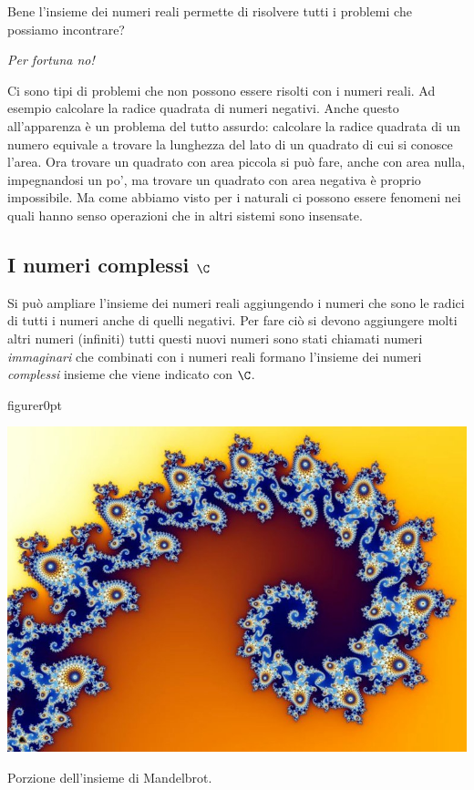 Bene l'insieme dei numeri reali permette di risolvere tutti i problemi che 
possiamo incontrare? 

\begin{center} \emph{Per fortuna no!} \end{center} 

Ci sono tipi di problemi che non possono essere risolti con i numeri reali.
Ad esempio calcolare la radice quadrata di numeri negativi. Anche questo 
all'apparenza è un problema del tutto assurdo: calcolare la radice quadrata di 
un numero equivale a trovare la lunghezza del lato di un quadrato di cui si 
conosce l'area. Ora trovare un quadrato con area piccola si può fare, anche con 
area nulla, impegnandosi un po', ma trovare un quadrato con area negativa 
è proprio impossibile. Ma come abbiamo visto per i naturali ci possono essere 
fenomeni nei quali hanno senso operazioni che in altri sistemi sono insensate.

\subsection{I numeri complessi $\C$}
\label{subsec:insnum_complessi}

Si può ampliare l'insieme dei numeri reali aggiungendo i numeri che sono le 
radici di tutti i numeri anche di quelli negativi. Per fare ciò si devono 
aggiungere molti altri numeri (infiniti) tutti questi nuovi numeri sono stati 
chiamati numeri \emph{immaginari} che combinati con i numeri reali formano 
l'insieme dei numeri \emph{complessi} insieme che viene indicato con $\C$.

\begin{wrapfloat}{figure}{r}{0pt}
\begin{inaccessibleblock}
\includegraphics[scale=0.30]{img/fractal.jpg}
\end{inaccessibleblock}
\caption{Porzione dell'insieme di Mandelbrot.}
\label{fig:mandelbrot}
\end{wrapfloat}

